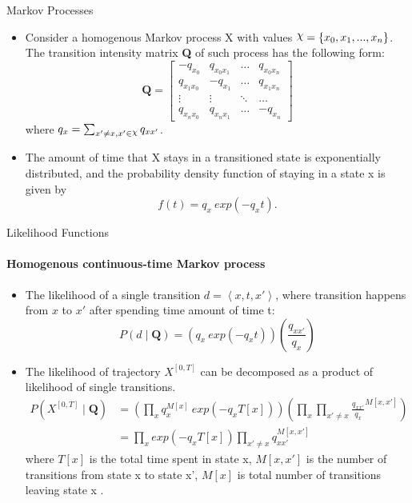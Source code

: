 \documentclass[
	english,%
	aspectratio=169,%
	color={accentcolor=3b},
	logo=true,%
	colorframetitle=false,%
	]{tudabeamer}
\DeclareRobustCommand{\rchi}{{\mathpalette\irchi\relax}}
\newcommand{\irchi}[2]{\raisebox{\depth}{$#1\chi$}}
\begin{document}
\begin{frame}{Markov Processes}
\begin{itemize}
	\item Consider a homogenous Markov process X with values $ \rchi = \left\lbrace x_{0}, x_{1},..., x_{n}\right\rbrace  $. The transition intensity matrix \textbf{Q} of such process has the following form:
	\begin{equation}
	\textbf{Q} = 
	\begin{bmatrix}
	-q_{x_{0}} & q_{x_{0}x_{1}} & 	{\hdots}  & q_{x_{0}x_{n}} \\
	q_{x_{1}x_{0}} & -q_{x_{1}} & 	{\hdots}  & q_{x_{1}x_{n}}  \\
	{\vdots}  & 	{\vdots}  & 	{\ddots}  & {\hdots}  \\
	 q_{x_{n}x_{0}} &  q_{x_{n}x_{1}} &  {\hdots} & -q_{x_{n}}
	\end{bmatrix}
	\end{equation}
	where $ q_{x} = \sum_{x' \neq x, x' \in \rchi} q_{xx'}$.
	\item The amount of time that X stays in a transitioned state is exponentially distributed, and the probability density function of staying in a state x is given by \cite{Nodelman1995}
	\begin{equation}
	f(t) = q_{x}\ exp(-q_{x}t).
	\end{equation}
\end{itemize}
\end{frame}


\begin{frame}{Likelihood Functions}
\framesubtitle{Homogenous continuous-time Markov process}
\fontsize{9pt}{6}\selectfont
\begin{itemize}
	\item The likelihood of a single transition $ d = \left\langle x,t,x'\right\rangle $, where transition happens from $x$ to $x'$ after spending time amount of time t:
	\begin{equation}
	P(d  \mid \textbf{Q}) = \left( q_{x}\ exp(-q_{x}t) \right) \left( \frac{q_{xx'}}{q_{x}} \right)
	\end{equation}
	\item The likelihood of trajectory $X^{[0,T]}$ can be decomposed as a product of likelihood of single transitions.
	\begin{align}
	P(X^{[0,T]}  \mid \textbf{Q}) & = \left( \prod_{x}  q_{x}^{M[x]}\ exp(-q_{x}T[x]) \right) \left( \prod_{x} \prod_{x' \neq x}  \frac{q_{xx'}}{q_{x}}^{M[x,x']} \right) \nonumber\\ & = \prod_{x}  exp(-q_{x}T[x]) \prod_{x' \neq x}  q_{xx'}^{M[x,x']}
	\label{homo_llh}
	\end{align}
	where $ T[x] $ is the total time spent in state x, $ M[x,x'] $ is the number of transitions from state x to state x', $ M[x] $ is total number of transitions leaving state x \cite{Nodelman2014}.
\end{itemize}
\end{frame}
\end{document}
